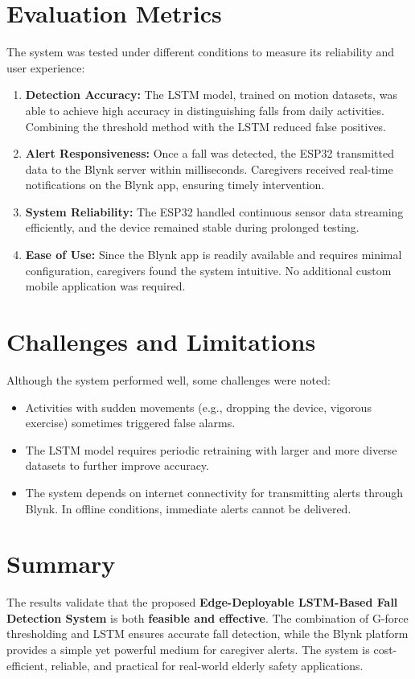 \documentclass[a4paper, 12pt]{report}
\begin{document}
\section{Evaluation Metrics}
The system was tested under different conditions to measure its reliability and user experience:
\begin{enumerate}
    \item \textbf{Detection Accuracy:}  
    The LSTM model, trained on motion datasets, was able to achieve high accuracy in distinguishing falls from daily activities. Combining the threshold method with the LSTM reduced false positives.  

    \item \textbf{Alert Responsiveness:}  
    Once a fall was detected, the ESP32 transmitted data to the Blynk server within milliseconds. Caregivers received real-time notifications on the Blynk app, ensuring timely intervention.  

    \item \textbf{System Reliability:}  
    The ESP32 handled continuous sensor data streaming efficiently, and the device remained stable during prolonged testing.  

    \item \textbf{Ease of Use:}  
    Since the Blynk app is readily available and requires minimal configuration, caregivers found the system intuitive. No additional custom mobile application was required.  
\end{enumerate}

\section{Challenges and Limitations}
Although the system performed well, some challenges were noted:
\begin{itemize}[itemsep=-4pt]
    \item Activities with sudden movements (e.g., dropping the device, vigorous exercise) sometimes triggered false alarms.  
    \item The LSTM model requires periodic retraining with larger and more diverse datasets to further improve accuracy.  
    \item The system depends on internet connectivity for transmitting alerts through Blynk. In offline conditions, immediate alerts cannot be delivered.  
\end{itemize}

\section{Summary}
The results validate that the proposed \textbf{Edge-Deployable LSTM-Based Fall Detection System} is both \textbf{feasible and effective}. The combination of G-force thresholding and LSTM ensures accurate fall detection, while the Blynk platform provides a simple yet powerful medium for caregiver alerts. The system is cost-efficient, reliable, and practical for real-world elderly safety applications.
\end{document}
